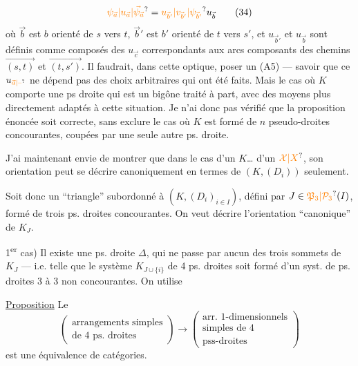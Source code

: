 \[\unsure{\psi_{\vec a}|u_{\vec a}|\vec\psi_{\vec a}}=\unsure{u_{\vec b'}|v_{\vec b'}|\psi_{\vec b'}}u_{\vec b}\tag*{(34)}\]
où $\vec b$ est $b$ orienté de $s$ vers $t$, $\vec b'$ est $b'$ orienté
de $t$ vers $s'$, et $u_{\vec b'}$ et $u_{\vec b}$ sont définis
comme composés des $u_{\vec c}$ correspondants
aux arcs  composants des chemins $\overrightarrow{(s,t)}$ et $\overrightarrow{(t,s')}$.
Il faudrait, dans cette optique, poser un
(A5) — savoir que ce $u_{\unsure{\vec a|\text{--}}}$ ne dépend pas des
choix arbitraires qui ont été faits. Mais
le cas où $K$ comporte une ps droite qui
est un bigône  
traité à part, avec des moyens plus
directement adaptés à cette situation. Je
n'ai donc pas vérifié que la proposition
énoncée soit correcte, sans exclure le
cas où $K$ est formé de $n$ pseudo-droites
concourantes, coupées par une seule
autre ps. droite.

J'ai maintenant envie de montrer
que dans le cas d'un $K$\ldots {} d'un $\unsure{\mathcal X|X}$,
son orientation peut se décrire canoniquement
en termes de $(K,(D_i))$ seulement.

Soit donc un ``triangle'' subordonné à
$(K,(D_i)_{i\in I})$,  défini par $J\in\unsure{\mathfrak P_3|\mathcal P_3}(I)$, formé
de trois ps. droites concourantes. On
veut décrire  l'orientation ``canonique''
de $K_J$.

 1\textsuperscript{er} cas) Il existe une  ps. droite
\deleted{\unsure{$\Theta$}} $\Delta$, qui ne passe par aucun des
trois sommets de $K_J$ — i.e. telle que
le système $K_{J\cup\{i\}}$ de 4 ps. droites
soit formé d'un syst. de  ps. droites
3 à 3 non concourantes. On utilise

\uline{Proposition} Le  
 
\[\left(\begin{gathered}\text{arrangements simples}\\\text{de 4 ps. droites}\end{gathered}\right)
\longrightarrow
\left(\begin{gathered}\text{arr. 1-dimensionnels}\\\text{simples de 4}\\\text{pss-droites}\end{gathered}\right)\]
est une équivalence de catégories.

